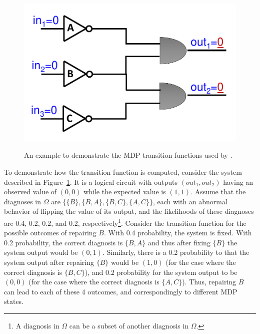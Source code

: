 \begin{figure}
\begin{center}
\includegraphics[width=0.5\columnwidth]{transition-example.pdf}%
\caption{An example to demonstrate the MDP transition functions used by \planbased .} %
\vspace{-0.6cm}
\label{fig:transition-example}%
\end{center}
\end{figure}

To demonstrate how the transition function is computed, consider the system described in Figure~\ref{fig:transition-example}. It is a logical circuit with outputs $(out_1,out_2)$ having an observed value of $(0,0)$ while the expected value is $(1,1)$. Assume that the diagnoses in $\Omega$ are $\{\{B\},\{B,A\},\{B,C\},\{A,C\}\}$, each with an abnormal behavior of flipping the value of its output, and the likelihoods of these diagnoses are 0.4, 0.2, 0.2, and 0.2, respectively\footnote{A diagnosis in $\Omega$ can be a subset of another diagnosis in $\Omega$.}. Consider the transition function for the possible outcomes of repairing $B$.
With 0.4 probability, the system is fixed.
With 0.2 probability, the correct diagnosis is $\{B,A\}$ and thus after fixing $\{B\}$ the system output would be $(0,1)$.
Similarly, there is a 0.2 probability to that the system output after repairing $\{B\}$ would be $(1,0)$ (for the case where the correct diagnosis is $\{B,C\}$),
and 0.2 probability for the system output to be $(0,0)$ (for the case where the correct diagnosis is $\{A,C\}$). Thus, repairing $B$ can lead to each of these 4 outcomes, and correspondingly to different MDP states.

